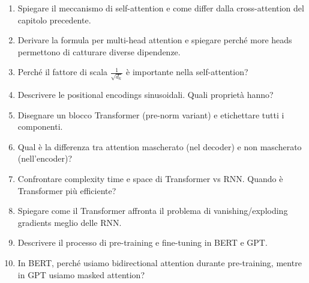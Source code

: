 \begin{enumerate}
\item Spiegare il meccanismo di self-attention e come differ dalla cross-attention del capitolo precedente.
\item Derivare la formula per multi-head attention e spiegare perché more heads permettono di catturare diverse dipendenze.
\item Perché il fattore di scala $\frac{1}{\sqrt{d_k}}$ è importante nella self-attention?
\item Descrivere le positional encodings sinusoidali. Quali proprietà hanno?
\item Disegnare un blocco Transformer (pre-norm variant) e etichettare tutti i componenti.
\item Qual è la differenza tra attention mascherato (nel decoder) e non mascherato (nell'encoder)?
\item Confrontare complexity time e space di Transformer vs RNN. Quando è Transformer più efficiente?
\item Spiegare come il Transformer affronta il problema di vanishing/exploding gradients meglio delle RNN.
\item Descrivere il processo di pre-training e fine-tuning in BERT e GPT.
\item In BERT, perché usiamo bidirectional attention durante pre-training, mentre in GPT usiamo masked attention?
\end{enumerate}


